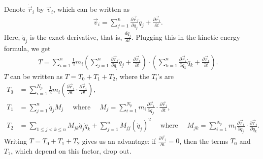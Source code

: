 Denote $\dot{\vec{r}}_{i}$ by $\vec{v}_{i}$, which can be written as
\begin{align}
    \vec{v}_{i} = \sum_{j=1}^{n} \frac{\partial \vec{r}_{i}}{\partial q_{j}} \dot{q}_{j} + \frac{\partial \vec{r}_{i}}{\partial t}.
\end{align}
Here, $\dot{q}_{j}$ is the exact derivative, that is, $\frac{d q_{j}}{d t}$. Plugging this in the kinetic energy formula, we get
\begin{align}
    T = \sum_{i=1}^{n} \frac{1}{2} m_{i} \left( \sum_{j=1}^{n} \frac{\partial \vec{r}_{i}}{\partial q_{j}} \dot{q}_{j} + \frac{\partial \vec{r}_{i}}{\partial t} \right) \cdot \left( \sum_{k=1}^{n} \frac{\partial \vec{r}_{i}}{\partial q_{k}} \dot{q}_{k} + \frac{\partial \vec{r}_{i}}{\partial t} \right).
\end{align}
$T$ can be written as $T = T_{0} + T_{1} + T_{2}$, where the $T_{i}$'s are
\begin{align}
    T_{0} &= \sum_{i=1}^{N_{p}} \frac{1}{2} m_{i} \left( \frac{\partial \vec{r}_{i}}{\partial t} \cdot \frac{\partial \vec{r}_{i}}{\partial t} \right),\\
    T_{1} &= \sum_{j=1}^{n} \dot{q}_{j} M_{j} \quad \text{ where } \quad M_{j} = \sum_{i=1}^{N_{p}} m_{i} \frac{\partial \vec{r}_{i}}{\partial q_{j}} \cdot \frac{\partial \vec{r}_{i}}{\partial t},\\
    T_{2} &= \sum_{1 \leq j < k \leq n} M_{jk} \dot{q}_{j} \dot{q}_{k} + \sum_{j=1}^{n} M_{jj} (\dot{q}_{j})^{2} \quad \text{ where } \quad M_{jk} = \sum_{i=1}^{N_{p}} m_{i} \frac{\partial \vec{r}_{i}}{\partial q_{j}} \cdot \frac{\partial \vec{r}_{i}}{\partial q_{k}}.
\end{align}
Writing $T = T_{0} + T_{1} + T_{2}$ gives us an advantage; if $\frac{\partial \vec{r}_{i}}{\partial t} = 0$, then the terms $T_{0}$ and $T_{1}$, which depend on this factor, drop out.

